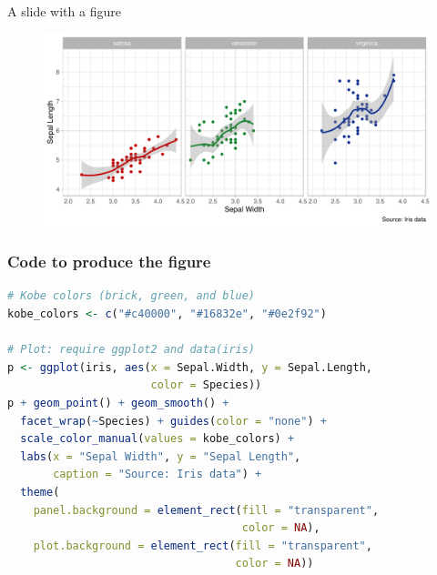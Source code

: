 \documentclass[12pt]{beamer}
\begin{document}
\begin{frame}{A slide with a figure}

\begin{figure}
\includegraphics[width = \linewidth]{figures/iris}
\end{figure}

\end{frame}

\begin{frame}[fragile]\frametitle{Code to produce the figure}

\begin{lstlisting}[language=R]
# Kobe colors (brick, green, and blue)
kobe_colors <- c("#c40000", "#16832e", "#0e2f92")

# Plot: require ggplot2 and data(iris)
p <- ggplot(iris, aes(x = Sepal.Width, y = Sepal.Length, 
                      color = Species))
p + geom_point() + geom_smooth() + 
  facet_wrap(~Species) + guides(color = "none") + 
  scale_color_manual(values = kobe_colors) + 
  labs(x = "Sepal Width", y = "Sepal Length", 
       caption = "Source: Iris data") + 
  theme(
    panel.background = element_rect(fill = "transparent", 
                                    color = NA),
    plot.background = element_rect(fill = "transparent", 
                                   color = NA))
\end{lstlisting}

\end{frame}
\end{document}
